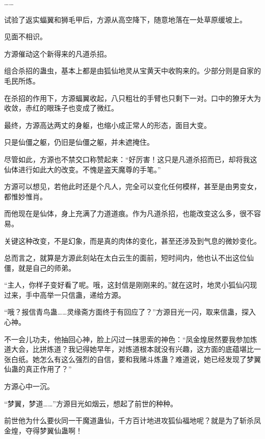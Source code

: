 \begin{this_body}
……

试验了返实蝠翼和狮毛甲后，方源从高空降下，随意地落在一处草原缓坡上。

见面不相识。

方源催动这个新得来的凡道杀招。

组合杀招的蛊虫，基本上都是由狐仙地灵从宝黄天中收购来的。少部分则是自家的毛民所炼。

在杀招的作用下，方源蝠翼收起，八只粗壮的手臂也只剩下一对。口中的獠牙大为收敛，赤红的眼珠子也变成了微红。

最终，方源高达两丈的身躯，也缩小成正常人的形态，面目大变。

只是仙僵之躯，仍旧是仙僵之躯，并未遮掩住。

尽管如此，方源也不禁交口称赞起来：“好厉害！这只是凡道杀招而已，却将我这仙体进行如此大的改变。不愧是盗天魔尊的手笔。”

方源可以想见，若他此时还是个凡人，完全可以变化任何模样，甚至是由男变女，都惟妙惟肖。

而他现在是仙体，身上充满了力道道痕。作为凡道杀招，也能改变这么多，很不容易。

关键这种改变，不是幻象，而是真的肉体的变化，甚至还涉及到气息的微妙变化。

总而言之，就算是方源此刻站在太白云生的面前，短时间内，他也认不出这位仙僵，就是自己的师弟。

“主人，你样子变好看了呢。哦，这封信是刚刚来的。”就在这时，地灵小狐仙闪现过来，手中高举一只信蛊，递给方源。

“哦？报信青鸟蛊……灵缘斋方面终于有回应了？”方源目光一闪，取来信蛊，探入心神。

不一会儿功夫，他抽回心神，脸上闪过一抹思索的神色：“凤金煌居然要我参加炼道大会，比拼炼道？我记得她早年，对炼道根本就没有兴趣，这方面的底蕴堪比一张白纸。她怎么有这么强烈的自信，要和我赌斗炼蛊？难道说，她已经发现了梦翼仙蛊的真正作用了？”

方源心中一沉。

“梦翼，梦道……”方源目光如烟云，想起了前世的种种。

前世他为什么要伙同一干魔道蛊仙，千方百计地进攻狐仙福地呢？就是为了斩杀凤金煌，夺得梦翼仙蛊啊！

\end{this_body}

